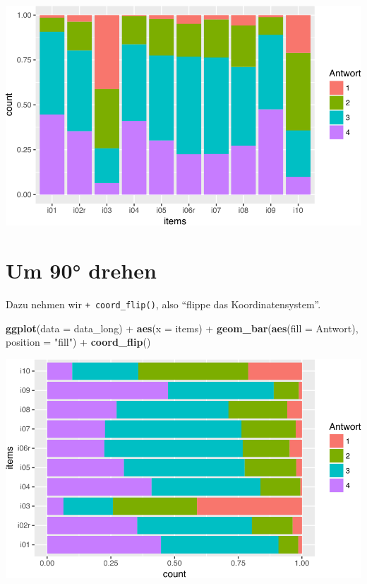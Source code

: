 \documentclass[12pt,ngerman,]{book}
\newenvironment{Shaded}{\begin{snugshade}}{\end{snugshade}}
\newcommand{\KeywordTok}[1]{\textcolor[rgb]{0.13,0.29,0.53}{\textbf{{#1}}}}
\newcommand{\DataTypeTok}[1]{\textcolor[rgb]{0.13,0.29,0.53}{{#1}}}
\newcommand{\StringTok}[1]{\textcolor[rgb]{0.31,0.60,0.02}{{#1}}}
\newcommand{\NormalTok}[1]{{#1}}
\renewenvironment{Shaded}{\begin{kframe}}{\end{kframe}}
\begin{document}
\begin{center}\includegraphics[width=0.7\linewidth]{056_Fallstudie_Visualisierung_files/figure-latex/unnamed-chunk-9-1} \end{center}

\section{Um 90° drehen}\label{um-90-drehen}

Dazu nehmen wir \texttt{+\ coord\_flip()}, also ``flippe das
Koordinatensystem''.

\begin{Shaded}
\begin{Highlighting}[]
\KeywordTok{ggplot}\NormalTok{(}\DataTypeTok{data =} \NormalTok{data_long) +}
\StringTok{  }\KeywordTok{aes}\NormalTok{(}\DataTypeTok{x =} \NormalTok{items)  +}
\StringTok{  }\KeywordTok{geom_bar}\NormalTok{(}\KeywordTok{aes}\NormalTok{(}\DataTypeTok{fill =} \NormalTok{Antwort), }\DataTypeTok{position =} \StringTok{"fill"}\NormalTok{) +}
\StringTok{  }\KeywordTok{coord_flip}\NormalTok{()}
\end{Highlighting}
\end{Shaded}

\begin{center}\includegraphics[width=0.7\linewidth]{056_Fallstudie_Visualisierung_files/figure-latex/unnamed-chunk-10-1} \end{center}
\end{document}
